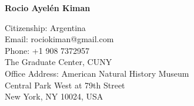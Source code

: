 \documentclass[10pt]{cv}
\newcommand{\firstpagestyle}{empty} %
\begin{document}
\thispagestyle{\firstpagestyle} 
\begin{center}
{\LARGE \textbf{\sc Rocio Ayel\'en Kiman}}\\
\bigskip
\bigskip
\end{center}
\normalsize
  
\addresses
{
Citizenship: Argentina\\
Email: rociokiman@gmail.com\\
Phone: +1 908 7372957 \\
}
{
The Graduate Center, CUNY\\
Office Address: American Natural History Museum\\
Central Park West at 79th Street\\
New York, NY 10024, USA\\ 
\\
}
\end{document}
